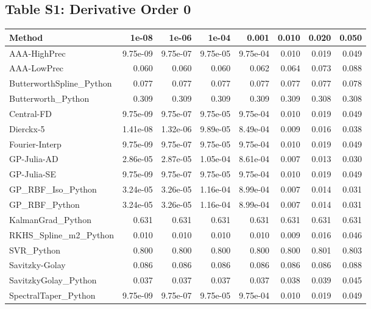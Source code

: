 
\subsection*{Table S1: Derivative Order 0}

\begin{longtable}{lrrrrrrr}
\toprule
\textbf{Method} & \textbf{1e-08} & \textbf{1e-06} & \textbf{1e-04} & \textbf{0.001} & \textbf{0.010} & \textbf{0.020} & \textbf{0.050} \\
\midrule
\endhead
AAA-HighPrec & 9.75e-09 & 9.75e-07 & 9.75e-05 & 9.75e-04 & 0.010 & 0.019 & 0.049 \\
AAA-LowPrec & 0.060 & 0.060 & 0.060 & 0.062 & 0.064 & 0.073 & 0.088 \\
ButterworthSpline\_Python & 0.077 & 0.077 & 0.077 & 0.077 & 0.077 & 0.077 & 0.078 \\
Butterworth\_Python & 0.309 & 0.309 & 0.309 & 0.309 & 0.309 & 0.308 & 0.308 \\
Central-FD & 9.75e-09 & 9.75e-07 & 9.75e-05 & 9.75e-04 & 0.010 & 0.019 & 0.049 \\
Dierckx-5 & 1.41e-08 & 1.32e-06 & 9.89e-05 & 8.49e-04 & 0.009 & 0.016 & 0.038 \\
Fourier-Interp & 9.75e-09 & 9.75e-07 & 9.75e-05 & 9.75e-04 & 0.010 & 0.019 & 0.049 \\
GP-Julia-AD & 2.86e-05 & 2.87e-05 & 1.05e-04 & 8.61e-04 & 0.007 & 0.013 & 0.030 \\
GP-Julia-SE & 9.75e-09 & 9.75e-07 & 9.75e-05 & 9.75e-04 & 0.010 & 0.019 & 0.049 \\
GP\_RBF\_Iso\_Python & 3.24e-05 & 3.26e-05 & 1.16e-04 & 8.99e-04 & 0.007 & 0.014 & 0.031 \\
GP\_RBF\_Python & 3.24e-05 & 3.26e-05 & 1.16e-04 & 8.99e-04 & 0.007 & 0.014 & 0.031 \\
KalmanGrad\_Python & 0.631 & 0.631 & 0.631 & 0.631 & 0.631 & 0.631 & 0.631 \\
RKHS\_Spline\_m2\_Python & 0.010 & 0.010 & 0.010 & 0.010 & 0.009 & 0.016 & 0.046 \\
SVR\_Python & 0.800 & 0.800 & 0.800 & 0.800 & 0.800 & 0.801 & 0.803 \\
Savitzky-Golay & 0.086 & 0.086 & 0.086 & 0.086 & 0.086 & 0.086 & 0.088 \\
SavitzkyGolay\_Python & 0.037 & 0.037 & 0.037 & 0.037 & 0.038 & 0.039 & 0.045 \\
SpectralTaper\_Python & 9.75e-09 & 9.75e-07 & 9.75e-05 & 9.75e-04 & 0.010 & 0.019 & 0.049 \\

\end{longtable}
